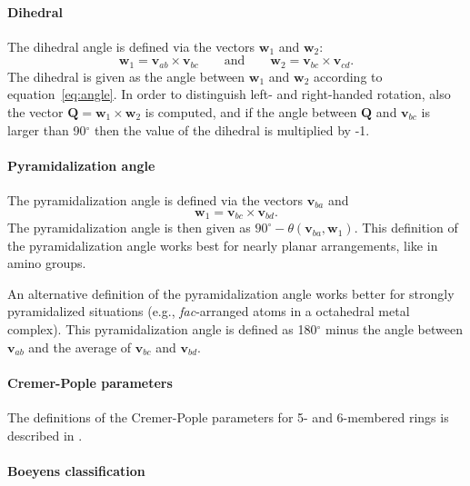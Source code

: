\documentclass[a4paper,10pt,DIV=15,openany,twoside=false]{scrbook}
\newcommand{\VEC}[1]{\ensuremath{\mathbf{#1}}}
\begin{document}
\paragraph{Dihedral}

The dihedral angle is defined via the vectors $\VEC{w}_1$ and $\VEC{w}_2$:
\begin{equation}
  \VEC{w}_1=\VEC{v}_{ab}\times\VEC{v}_{bc}\qquad\text{and}\qquad\VEC{w}_2=\VEC{v}_{bc}\times\VEC{v}_{cd}.
\end{equation}
The dihedral is given as the angle between $\VEC{w}_1$ and $\VEC{w}_2$ according to equation~\eqref{eq:angle}.
In order to distinguish left- and right-handed rotation, also the vector $\VEC{Q}=\VEC{w}_1\times\VEC{w}_2$ is computed, and if the angle between $\VEC{Q}$ and $\VEC{v}_{bc}$ is larger than 90$^\circ$ then the value of the dihedral is multiplied by -1.

\paragraph{Pyramidalization angle}

The pyramidalization angle is defined via the vectors $\VEC{v}_{ba}$ and 
\begin{equation}
  \VEC{w}_1=\VEC{v}_{bc}\times\VEC{v}_{bd}.
\end{equation}
The pyramidalization angle is then given as $90^\circ - \theta(\VEC{v}_{ba},\VEC{w}_1)$.
This definition of the pyramidalization angle works best for nearly planar arrangements, like in amino groups.

An alternative definition of the pyramidalization angle works better for strongly pyramidalized situations (e.g., \emph{fac}-arranged atoms in a octahedral metal complex).
This pyramidalization angle is defined as 180$^\circ$ minus the angle between $\VEC{v}_{ab}$ and the average of $\VEC{v}_{bc}$ and $\VEC{v}_{bd}$.

\paragraph{Cremer-Pople parameters}

The definitions of the Cremer-Pople parameters for 5- and 6-membered rings is described in \cite{Cremer1975JACS}.

\paragraph{Boeyens classification}
\end{document}
